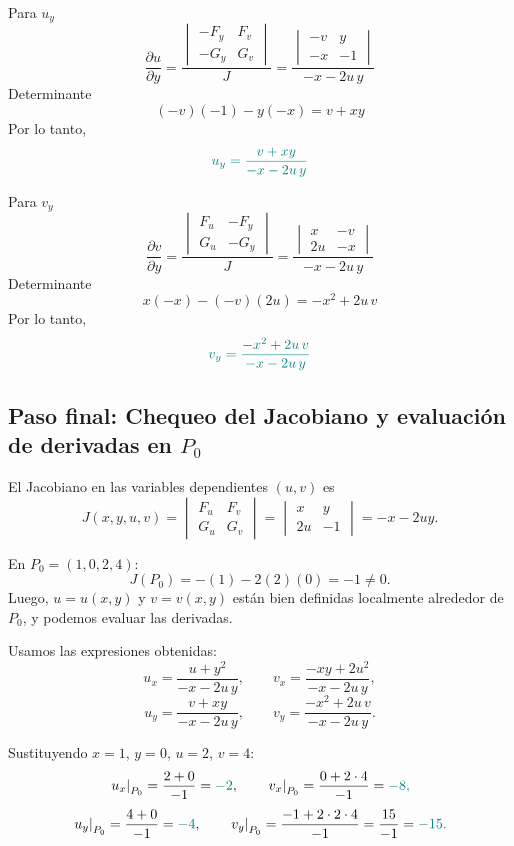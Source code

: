 \documentclass{article}
\begin{document}
Para \( \displaystyle u_y\)
\[
\frac{\partial u}{\partial y} =
\frac{
\begin{vmatrix}
- F_y & F_v \\
- G_y & G_v
\end{vmatrix}
}{J}
=\frac{
\begin{vmatrix}
- v & y \\
- x & -1
\end{vmatrix}
}{-x - 2u\,y}
\]
Determinante
\[
(-v)(-1) - y(-x) = v + xy
\]
Por lo tanto,
\[\color{teal}
u_y = \frac{v + xy}{-x - 2u\,y}
\]

Para \( \displaystyle v_y\)
\[
\frac{\partial v}{\partial y} =
\frac{
\begin{vmatrix}
F_u & - F_y \\
G_u & - G_y
\end{vmatrix}
}{J}
=\frac{
\begin{vmatrix}
x & - v \\
2u & - x
\end{vmatrix}
}{-x - 2u\,y}
\]
Determinante
\[
x(-x) - (-v)(2u) = -x^2 + 2u\,v
\]
Por lo tanto,
\[\color{teal}
v_y = \frac{-x^2 + 2u\,v}{-x - 2u\,y}
\]



\subsection*{Paso final: Chequeo del Jacobiano y evaluación de derivadas en $P_0$}

El Jacobiano en las variables dependientes \((u,v)\) es
\[
J(x,y,u,v)=
\begin{vmatrix}
F_u & F_v\\
G_u & G_v
\end{vmatrix}
=
\begin{vmatrix}
x & y\\
2u & -1
\end{vmatrix}
=-x-2uy.
\]

En \(P_0=(1,0,2,4)\):
\[
J(P_0)=-(1)-2(2)(0)=-1\neq 0.
\]
Luego, \(u=u(x,y)\) y \(v=v(x,y)\) están bien definidas localmente alrededor de \(P_0\), y podemos evaluar las derivadas.

\medskip
Usamos las expresiones obtenidas:
\[
u_x = \frac{u + y^2}{-x - 2u\,y},\qquad
v_x = \frac{-xy + 2u^2}{-x - 2u\,y},
\]
\[
u_y = \frac{v + xy}{-x - 2u\,y},\qquad
v_y = \frac{-x^2 + 2u\,v}{-x - 2u\,y}.
\]

Sustituyendo \(x=1\), \(y=0\), \(u=2\), \(v=4\):
\[
\left.u_x\right|_{P_0}=\frac{2+0}{-1}={\color{teal}-2},
\qquad
\left.v_x\right|_{P_0}=\frac{0+2\cdot 4}{-1}=\color{teal}-8,
\]
\[
\left.u_y\right|_{P_0}=\frac{4+0}{-1}={\color{teal}-4},
\qquad
\left.v_y\right|_{P_0}=\frac{-1+2\cdot 2\cdot 4}{-1}=\frac{15}{-1}=\color{teal}-15.
\]
\end{document}
